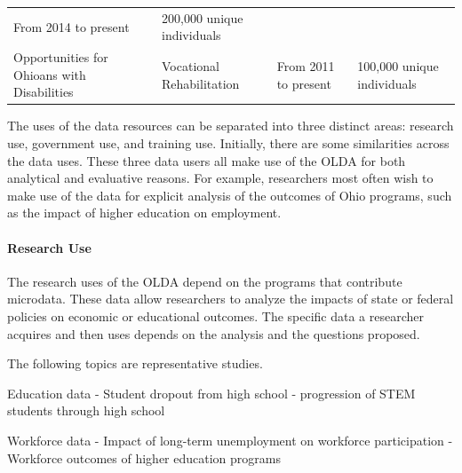 \documentclass[
]{WileySix}
\begin{document}
\begin{longtable}[]{@{}llll@{}}
\begin{minipage}[t]{0.18\columnwidth}
From 2014 to
present\strut
\end{minipage} & \begin{minipage}[t]{0.18\columnwidth}\raggedright
200,000
unique
individuals\strut
\end{minipage}\tabularnewline
\begin{minipage}[t]{0.19\columnwidth}\raggedright
Opportunities
for
Ohioans
with
Disabilities\strut
\end{minipage} & \begin{minipage}[t]{0.34\columnwidth}\raggedright
Vocational Rehabilitation\strut
\end{minipage} & \begin{minipage}[t]{0.18\columnwidth}\raggedright
From 2011 to
present\strut
\end{minipage} & \begin{minipage}[t]{0.18\columnwidth}\raggedright
100,000
unique
individuals\strut
\end{minipage}\tabularnewline
\bottomrule
\end{longtable}

The uses of the data resources can be separated into three distinct areas: research use, government use, and training use. Initially, there are some similarities across the data uses. These three data users all make use of the OLDA for both analytical and evaluative reasons. For example, researchers most often wish to make use of the data for explicit analysis of the outcomes of Ohio programs, such as the impact of higher education on employment.

\hypertarget{research-use}{%
\paragraph{Research Use}\label{research-use}}

The research uses of the OLDA depend on the programs that contribute microdata. These data allow researchers to analyze the impacts of state or federal policies on economic or educational outcomes. The specific data a researcher acquires and then uses depends on the analysis and the questions proposed.

The following topics are representative studies.

Education data
- Student dropout from high school
- progression of STEM students through high school

Workforce data
- Impact of long-term unemployment on workforce participation
- Workforce outcomes of higher education programs
\end{document}
